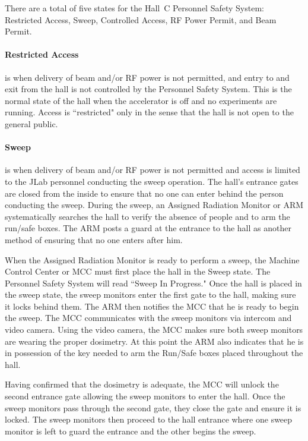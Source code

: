 There are a total of five states for the Hall~C Personnel Safety System:
Restricted Access,
Sweep, Controlled Access, RF Power Permit, and Beam Permit.

\paragraph{Restricted Access} is when delivery of beam and/or RF power is not
permitted, and entry
to and exit from the hall is not controlled by the Personnel Safety System.
This is the normal
state of the hall when the accelerator is off and no experiments are running.
Access is
``restricted" only in the sense that the hall is not open to the general public.

\paragraph{Sweep} is when delivery of beam and/or RF power is not permitted and 
access is limited
to the JLab personnel conducting the sweep operation. The hall's entrance
gates are closed
from the inside to ensure that no one can enter behind the person
conducting the sweep. During
the sweep, an Assigned Radiation Monitor or ARM systematically searches the
hall to verify
the absence of people and to arm the run/safe boxes. The ARM posts a guard
at the entrance to
the hall as another method of ensuring that no one enters after him.


When the Assigned Radiation Monitor is ready to perform a sweep, the
Machine Control
Center or MCC must first place the hall in the Sweep state. The Personnel
Safety System will
read ``Sweep In Progress." Once the hall is placed in the sweep state, the
sweep monitors enter
the first gate to the hall, making sure it locks behind them. The ARM then
notifies the MCC that
he is ready to begin the sweep. The MCC communicates with the sweep
monitors via intercom
and video camera. Using the video camera, the MCC makes sure both sweep
monitors are
wearing the proper dosimetry. At this point the ARM also indicates that he
is in possession of
the key needed to arm the Run/Safe boxes placed throughout the hall.

Having confirmed that the dosimetry is adequate, the MCC will unlock the
second
entrance gate allowing the sweep monitors to enter the hall. Once the sweep
monitors pass
through the second gate, they close the gate and ensure it is locked. The
sweep monitors then
proceed to the hall entrance where one sweep monitor is left to guard the
entrance and the other
begins the sweep.

